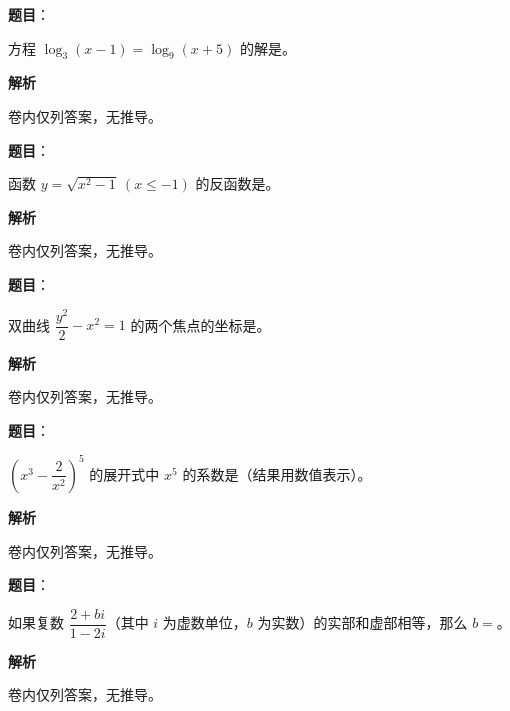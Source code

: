 \begin{answer}

\textbf{题目}：

方程 $\log_3(x-1)=\log_9(x+5)$ 的解是\gkblank{}。

\textbf{解析}

卷内仅列答案，无推导。


\end{answer}
\begin{answer}

\textbf{题目}：

函数 $y=\sqrt{x^2-1}\ (x\le -1)$ 的反函数是\gkblank{}。

\textbf{解析}

卷内仅列答案，无推导。


\end{answer}
\begin{answer}

\textbf{题目}：

双曲线 $\dfrac{y^2}{2}-x^2=1$ 的两个焦点的坐标是\gkblank{}。

\textbf{解析}

卷内仅列答案，无推导。


\end{answer}
\begin{answer}

\textbf{题目}：

$\left(x^3-\dfrac{2}{x^2}\right)^5$ 的展开式中 $x^5$ 的系数是\gkblank{}（结果用数值表示）。

\textbf{解析}

卷内仅列答案，无推导。


\end{answer}
\begin{answer}

\textbf{题目}：

如果复数 $\dfrac{2+bi}{1-2i}$（其中 $i$ 为虚数单位，$b$ 为实数）的实部和虚部相等，那么 $b=$\gkblank{}。

\textbf{解析}

卷内仅列答案，无推导。


\end{answer}
